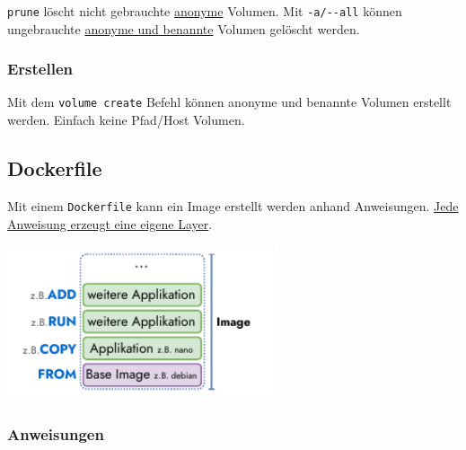 \documentclass[
  10pt,
  a4paper,
]{article}
\newenvironment{Shaded}{}{}
\newcommand{\ExtensionTok}[1]{\textcolor[rgb]{0.84,0.23,0.29}{\textbf{#1}}}
\newcommand{\NormalTok}[1]{\textcolor[rgb]{0.14,0.16,0.18}{#1}}
\newcommand{\PreprocessorTok}[1]{\textcolor[rgb]{0.84,0.23,0.29}{#1}}
\newcommand{\SpecialStringTok}[1]{\textcolor[rgb]{0.01,0.18,0.38}{#1}}
\begin{document}
\begin{multicols*}{2}
\texttt{prune} löscht nicht gebrauchte \ul{anonyme} Volumen. Mit
\texttt{-a/-\/-all} können ungebrauchte \ul{anonyme und benannte}
Volumen gelöscht werden.

\begin{Shaded}
\end{Shaded}

\subsubsection{\texorpdfstring{{\small \faTerminal\hspace{1mm}}
Erstellen}{ Erstellen}}\label{erstellen}

Mit dem \texttt{volume\ create} Befehl können anonyme und benannte
Volumen erstellt werden. Einfach keine Pfad/Host Volumen.

\begin{Shaded}
\end{Shaded}

\subsection{Dockerfile}\label{dockerfile}

Mit einem \faFile[regular] \texttt{Dockerfile} kann ein Image erstellt
werden anhand Anweisungen. \ul{Jede Anweisung erzeugt eine eigene
Layer}.

\begin{center}
\includegraphics[width=8cm,height=\textheight]{images/docker/dockerfile_image.pdf}
\end{center}

\subsubsection{Anweisungen}\label{anweisungen}


\end{multicols*}
\end{document}
